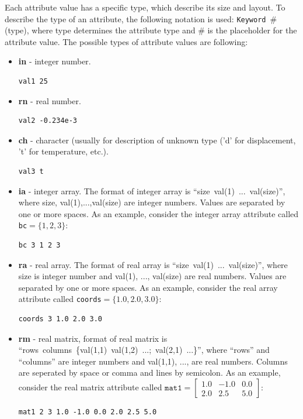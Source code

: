 \documentclass[a4paper]{article}
\newcommand{\param}[1]{\texttt{#1}} %
\newcommand{\field}[2]{\param{#1}~\#{\tiny(#2)}} %
\begin{document}
Each attribute value has a specific type, which describe its size and layout. To describe the type of an attribute, the following notation is used: 
\field{Keyword}{type}, where type determines the attribute type and \# is the placeholder for the attribute value.
The possible types of attribute values are following:
\begin{itemize}
\item \textbf{in} - integer number.
\begin{lstlisting}[style=oofem, language=oofeminput, moreemph={val1}]
val1 25
\end{lstlisting}

\item \textbf{rn} - real number.
\begin{lstlisting}[style=oofem, language=oofeminput, moreemph={val2}]
val2 -0.234e-3
\end{lstlisting}
\item \textbf{ch} - character (usually for description of unknown type ('d' for
displacement, 't' for temperature, etc.).
\begin{lstlisting}[style=oofem, language=oofeminput, moreemph={val3}]
val3 t
\end{lstlisting}

\item \textbf{ia} - integer array. The format of integer array is
``size~val(1)~...~val(size)'', where size, val(1),...,val(size) are
integer numbers. Values are separated by one or more spaces. As an example, consider the integer array attribute called \param{bc}$=\{1,2,3\}$:
\begin{lstlisting}[style=oofem, language=oofeminput, moreemph={bc}]
bc 3 1 2 3
\end{lstlisting}
\item \textbf{ra} - real array. The format of real array is
``size~val(1)~...~val(size)'', where size is integer number and val(1),
..., val(size) are real numbers. Values are separated by one or more spaces. As an example, consider the real array attribute called \param{coords}$=\{1.0,2.0,3.0\}$:
\begin{lstlisting}[style=oofem, language=oofeminput, moreemph={coords}]
coords 3 1.0 2.0 3.0
\end{lstlisting}
\item \textbf{rm} - real matrix, format of real matrix is\\
``rows~columns~\{val(1,1)~val(1,2)~...;~val(2,1)~...\}'', where ``rows'' and ``columns'' are integer numbers and val(1,1),
..., are real numbers. Columns are seperated by space or comma and lines by semicolon.
As an example, consider the real matrix attribute called $\param{mat1}=\left[\begin{array}{ccc}1.0&-1.0&0.0\\2.0&2.5&5.0\end{array}\right]$:
\begin{lstlisting}[style=oofem, language=oofeminput, moreemph={mat1}]
mat1 2 3 1.0 -1.0 0.0 2.0 2.5 5.0
\end{lstlisting}


\end{itemize}
\end{document}
